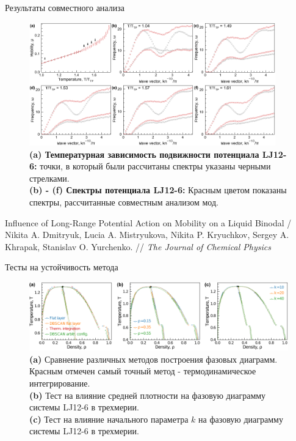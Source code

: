 \documentclass{beamer} %
\begin{document}
\begin{frame}{Результаты совместного анализа}
  \scriptsize{

    \begin{figure}
      \centering
      \includegraphics[width=0.95\textwidth]{MACR-Figure4}
      \caption{\scriptsize{\textbf{(a) Температурная зависимость подвижности потенциала LJ12-6:} точки, в который были рассчитаны спектры указаны черными стрелками.\\
          \textbf{(b) - (f) Спектры потенциала LJ12-6:} Красным цветом показаны спектры, рассчитанные совместным анализом мод.}}
      \label{Figure4}
    \end{figure}
  }

  \tiny{Influence of Long-Range Potential Action on Mobility on a Liquid Binodal / Nikita A. Dmitryuk, Lucia A. Mistryukova, Nikita P. Kryuchkov, Sergey A. Khrapak, Stanislav O. Yurchenko. // \textit{The Journal of Chemical Physics}}
\end{frame}




\begin{frame}{Тесты на устойчивость метода}
  \footnotesize{
    \begin{figure}[!t]
      \centering
      \includegraphics[width=\linewidth]{Figure10.pdf}
      \caption{\textbf{(a)} Сравнение различных методов построения фазовых диаграмм. Красным отмечен самый точный метод - термодинамическое интегрирование.\\
        \textbf{(b)} Тест на влияние средней плотности на фазовую диаграмму системы LJ12-6 в трехмерии.\\
        \textbf{(c)} Тест на влияние начального параметра $k$ на фазовую диаграмму системы LJ12-6 в трехмерии.}
      \label{tests}
    \end{figure}
  }

\end{frame}
\end{document}
